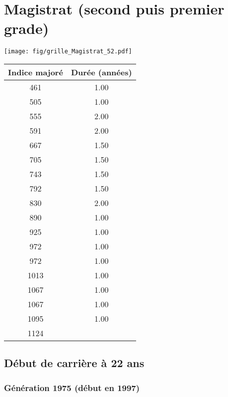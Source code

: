 \chapter{Magistrat (second puis premier grade)} 

\begin{minipage}{0.55\linewidth}\texttt{[image: fig/grille\_Magistrat\_52.pdf]}\end{minipage} 
\begin{minipage}{0.3\linewidth} 
 \begin{center} 

\begin{tabular}[htb]{|c|c|} 
\hline 
 Indice majoré &  Durée (années) \\ 
\hline \hline 
 461 &  1.00 \\ 
\hline 
 505 &  1.00 \\ 
\hline 
 555 &  2.00 \\ 
\hline 
 591 &  2.00 \\ 
\hline 
 667 &  1.50 \\ 
\hline 
 705 &  1.50 \\ 
\hline 
 743 &  1.50 \\ 
\hline 
 792 &  1.50 \\ 
\hline 
 830 &  2.00 \\ 
\hline 
 890 &  1.00 \\ 
\hline 
 925 &  1.00 \\ 
\hline 
 972 &  1.00 \\ 
\hline 
 972 &  1.00 \\ 
\hline 
 1013 &  1.00 \\ 
\hline 
 1067 &  1.00 \\ 
\hline 
 1067 &  1.00 \\ 
\hline 
 1095 &  1.00 \\ 
\hline 
 1124 &   \\ 
\hline 
\hline 
\end{tabular} 
\end{center} 
 \end{minipage} 


 \addto{\captionsenglish}{ \renewcommand{\mtctitle}{}} \setcounter{minitocdepth}{2} 
 \minitoc \newpage 

\section{Début de carrière à 22 ans} 

\subsection{Génération 1975 (début en 1997)} 

